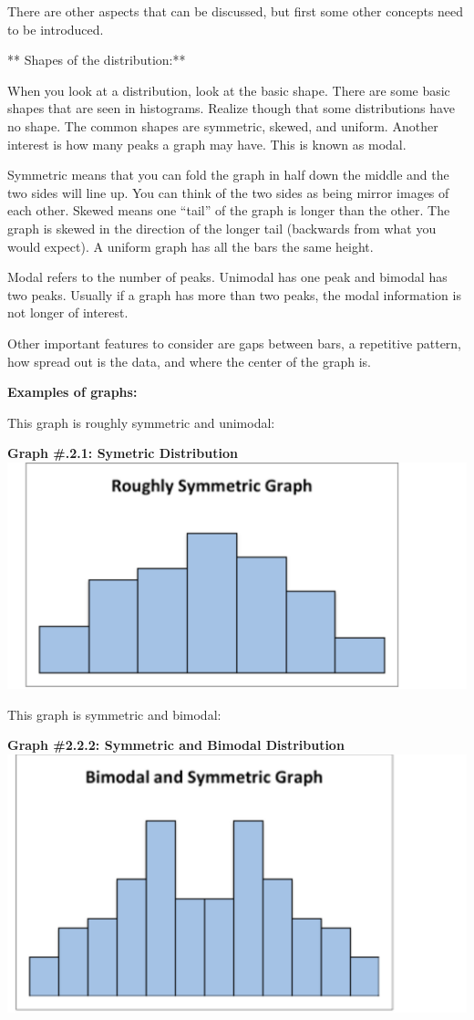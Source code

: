 \documentclass[]{book}
\begin{document}
There are other aspects that can be discussed, but first some other concepts need to be introduced.

** Shapes of the distribution:**

When you look at a distribution, look at the basic shape. There are some
basic shapes that are seen in histograms. Realize though that some
distributions have no shape. The common shapes are symmetric, skewed,
and uniform. Another interest is how many peaks a graph may have. This
is known as modal.

Symmetric means that you can fold the graph in half down the middle and
the two sides will line up. You can think of the two sides as being
mirror images of each other. Skewed means one ``tail'' of the graph is
longer than the other. The graph is skewed in the direction of the
longer tail (backwards from what you would expect). A uniform graph has
all the bars the same height.

Modal refers to the number of peaks. Unimodal has one peak and bimodal
has two peaks. Usually if a graph has more than two peaks, the modal
information is not longer of interest.

Other important features to consider are gaps between bars, a repetitive
pattern, how spread out is the data, and where the center of the graph is.

\textbf{Examples of graphs:}

This graph is roughly symmetric and unimodal:

\textbf{Graph \#.2.1: Symetric Distribution}
\includegraphics{symmetric.png}

This graph is symmetric and bimodal:

\textbf{Graph \#2.2.2: Symmetric and Bimodal Distribution}
\includegraphics{bimodal_symmetric.png}
\end{document}
